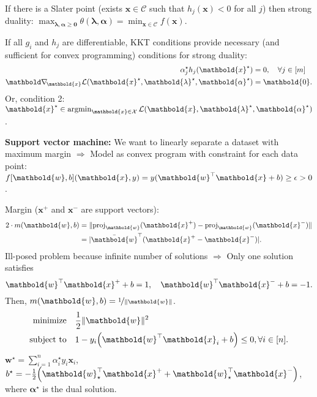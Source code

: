 \documentclass[9pt]{extarticle}
\newenvironment{topic}[1]
{\textbf{\sffamily \colorbox{black}{\rlap{\textbf{\textcolor{white}{#1}}}\hspace{\linewidth}\hspace{-2\fboxsep}}}}
{}
\newenvironment{subtopic}[1]
{\textbf{\sffamily #1:}}
{}
\renewcommand{\vec}[1]{\ensuremath{\mathbold{#1}}}
\begin{document}
\begin{multicols*}{3}
\begin{topic}{Convex optimization and SVMs}
        If there is a Slater point (exists $\vec{x} \in \mathcal{C}$ such that $h_j(\vec{x}) < 0$ for all
        $j$) then strong duality: $\max_{\vec{\lambda}, \vec{\alpha} \geq \vec{0}} \theta(\vec{\lambda},
            \vec{\alpha}) = \min_{\vec{x} \in \mathcal{C}} f(\vec{x})$.

        If all $g_i$ and $h_j$ are differentiable, KKT conditions provide necessary (and sufficient for
        convex programming) conditions for strong duality:
        \begin{align*}
            \alpha_j^\star h_j(\vec{x}^\star)                                                   & = 0, \quad \forall j \in [m] \\
            \grad{\mathcal{L}(\vec{x}^\star, \vec{\lambda}^\star, \vec{\alpha}^\star)}{\vec{x}} & = \vec{0}.
        \end{align*}
        Or, condition 2: $\vec{x}^\star \in \argmin_{\vec{x} \in \mathcal{X}} \mathcal{L}(\vec{x}, \vec{\lambda}^\star, \vec{\alpha}^\star)$.

        \begin{subtopic}{Support vector machine}
            We want to linearly separate a dataset with maximum margin $\Rightarrow$ Model as convex program
            with constraint for each data point: $f[\vec{w},b](\vec{x},y) = y (\transpose{\vec{w}}\vec{x} + b) \geq \epsilon > 0$.

            Margin ($\vec{x}^+$ and $\vec{x}^-$ are support vectors):
            \begin{align*}
                2 \cdot m(\vec{w},b) & = \| \mathrm{proj}_{\vec{w}}(\vec{x}^+) - \mathrm{proj}_{\vec{w}}(\vec{x}^-) \| \\
                                     & = |\transpose{\bar{\vec{w}}} (\vec{x}^+ - \vec{x}^-)|.
            \end{align*}
            Ill-posed problem because infinite number of solutions $\Rightarrow$ Only one solution satisfies \[
                \transpose{\vec{w}} \vec{x}^+ +b = 1, \quad \transpose{\vec{w}} \vec{x}^- + b = -1.
            \]
            Then, $m(\vec{w},b) = \nicefrac{1}{\| \vec{w} \|}$.
            \begin{align*}
                \text{minimize}   & \quad \frac{1}{2} \| \vec{w} \|^2                                                     \\
                \text{subject to} & \quad 1 - y_i \lft( \transpose{\vec{w}}\vec{x}_i + b \rgt) \leq 0, \forall i \in [n].
            \end{align*}
            $\vec{w}^\star = \sum_{i=1}^{n} \alpha^\star_i y_i \vec{x}_i$, $b^\star = -\frac{1}{2} \lft( \transpose{\vec{w}_{\star}} \vec{x}^+ + \transpose{\vec{w}_{\star}} \vec{x}^- \rgt)$,
            where $\vec{\alpha}^\star$ is the dual solution.


\end{subtopic}
\end{topic}
\end{multicols*}
\end{document}
